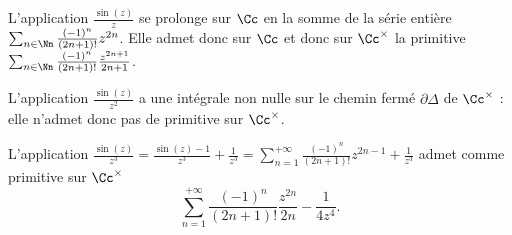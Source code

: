 {\begin{enumerate}
{  
  L'application $\frac{\sin(z)}{z}$ se prolonge sur $\Cc$ en la somme de la série entière $\sum_{n\in\Nn}\frac{(-1)^n}{(2n+1)!}z^{2n}$.
  Elle admet donc sur $\Cc$ et donc sur $\Cc^\times$ la primitive $\sum_{n\in\Nn}\frac{(-1)^n}{(2n+1)!}\frac{z^{2n+1}}{2n+1}$.
  
  
  L'application $\frac{\sin(z)}{z^2}$ a une intégrale non nulle sur le chemin fermé $\partial\Delta$ de $\Cc^\times$ : elle n'admet donc pas de primitive sur $\Cc^\times$.
  
  
  L'application $\frac{\sin(z)}{z^3}=\frac{\sin(z)-1}{z^3}+\frac{1}{z^3}=\sum_{n=1}^{+\infty}\frac{(-1)^n}{(2n+1)!}z^{2n-1}+\frac{1}{z^3}$ 
  admet comme primitive sur $\Cc^\times$
  $$\sum_{n=1}^{+\infty}\frac{(-1)^n}{(2n+1)!}\frac{z^{2n}}{2n}-\frac{1}{4z^4}.$$}
\end{enumerate}
}